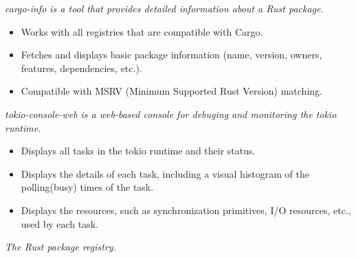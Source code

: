 \documentclass{software_engineer_rustin_liu}
\newcommand{\en}[1]{#1}
\newcommand{\zh}[1]{}
\begin{document}
\en{}
\zh{\datedsubsection{\textbf{cargo-information(Rust) - 作者}}{{\href{https://github.com/hi-rustin/cargo-information}{270+ commits}}}}
\en{\textsl{cargo-info is a tool that provides detailed information about a Rust package.}}
\zh{\textsl{cargo-info 是一个提供 Rust 包详细信息的工具。}}

\begin{itemize}
      \item \en{Works with all registries that are compatible with Cargo.}
            \zh{兼容所有与 Cargo 兼容的注册中心。}
      \item \en{Fetches and displays basic package information (name, version, owners, features, dependencies, etc.).}
            \zh{获取并显示基本的包信息（名称、版本、所有者、features、依赖等）。}
      \item \en{Compatible with MSRV (Minimum Supported Rust Version) matching.}
            \zh{兼容 MSRV（最小支持 Rust 版本）匹配。}
\end{itemize}

\en{}
\zh{\datedsubsection{\textbf{tokio-console-web(TypeScript/Rust) - 作者}}{{\href{https://github.com/hi-rustin/tokio-console-web}{385+ commits}}}}
\en{\textsl{tokio-console-web is a web-based console for debuging and monitoring the tokio runtime.}}
\zh{\textsl{tokio-console-web 是一个基于 web 的控制台，用于调试和监控 tokio runtime。}}

\begin{itemize}
      \item \en{Displays all tasks in the tokio runtime and their status.}
            \zh{显示 tokio runtime 中的所有任务及其状态。}
      \item \en{Displays the details of each task, including a visual histogram of the polling(busy) times of the task.}
            \zh{显示每个任务的详细信息，包括任务的轮询（忙碌）时间的柱状图。}
      \item \en{Displays the resources, such as synchronization primitives, I/O resources, etc., used by each task.}
            \zh{显示每个任务使用的资源，如同步原语、I/O 资源等。}
\end{itemize}


\en{}
\zh{\datedsubsection{\textbf{crates.io(Rust/JS) - 维护者}}{{\href{https://github.com/rust-lang/crates.io/commits?author=hi-rustin}{60+ commits}}}}
\en{\textsl{The Rust package registry.}}
\zh{\textsl{Rust 包管理中心。}}
\end{document}
